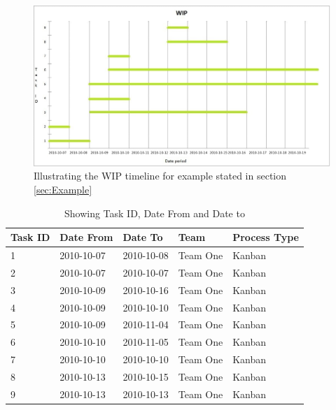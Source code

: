 \documentclass[UKenglish]{ifimaster}  %
\begin{document}
\begin{figure}[ht!]
 \begin{adjustwidth}{-0.5cm}{}
\centering
\hspace*{-1in}
\includegraphics[width=21cm,trim=4 8 8 4,clip]{Picture/wip_example.jpg}
\caption{Illustrating the WIP timeline for example stated in section \ref{sec:Example}}
\label{wip_timeline}
\end{adjustwidth}
\end{figure}

\newpage
\begin{table}[!ht]
\begin{center}
\caption{Showing Task ID, Date From and Date to}
    \begin{tabular}{| l | l | p{2cm} | l | l |}
    \hline
   Task ID &   Date From  & Date To & Team & Process Type\\ \hline
     1 & 2010-10-07 & 2010-10-08 & Team One & Kanban  \\ \hline
     2 & 2010-10-07 & 2010-10-07 & Team One & Kanban   \\ \hline
     3 & 2010-10-09 & 2010-10-16 & Team One & Kanban   \\ \hline
     4 & 2010-10-09 & 2010-10-10 & Team One & Kanban   \\ \hline
     5 & 2010-10-09 & 2010-11-04 & Team One & Kanban   \\ \hline
     6 & 2010-10-10 & 2010-11-05 & Team One & Kanban  \\ \hline
     7 & 2010-10-10 & 2010-10-10 & Team One & Kanban   \\ \hline
     8 & 2010-10-13 & 2010-10-15 & Team One & Kanban  \\ \hline
     9 & 2010-10-13 & 2010-10-13  & Team One  & Kanban   \\ \hline
    \end{tabular}
\label{wt:2} %
\end{center}
\end{table}
\end{document}
